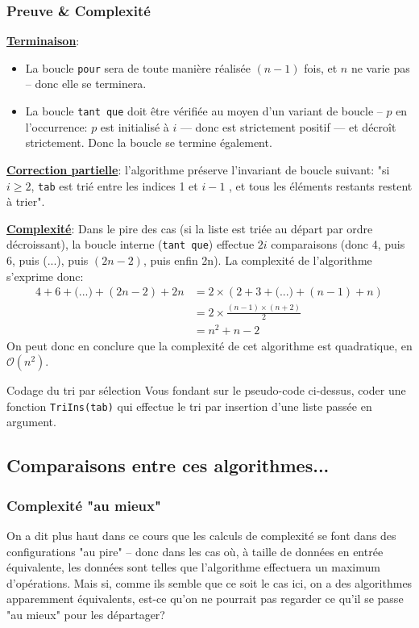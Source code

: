 \documentclass[12pt]{article}
\begin{document}
	\subsubsection*{Preuve \& Complexité}
	\textbf{\uline{Terminaison}}: 
	\begin{itemize}
		\item La boucle \texttt{pour} sera de toute manière réalisée $(n-1)$ fois, et $n$ ne varie pas -- donc elle se terminera.
		\item La boucle \texttt{tant que} doit être vérifiée au moyen d'un variant de boucle -- $p$ en l'occurrence: $p$ est initialisé à $i$ --- donc est strictement positif --- et décroît strictement. Donc la boucle se termine également.
	\end{itemize}
	
	\textbf{\uline{Correction partielle}}: l'algorithme préserve l'invariant de boucle suivant: "si $i \geq 2$, \texttt{tab} est trié entre les indices 1 et $i - 1$ , et tous les éléments restants restent à trier".
	
	\textbf{\uline{Complexité}}: Dans le pire des cas (si la liste est triée au départ par ordre décroissant), la boucle interne (\texttt{tant que}) effectue $2i$ comparaisons (donc 4, puis 6, puis (...), puis $(2n - 2)$, puis enfin 2n). La complexité de l'algorithme s'exprime donc:
	\begin{align*}
	4 + 6 + \text{(...)} + (2n-2) + 2n &= 2 \times (2 + 3 + \text{(...)} + (n-1) + n) \\
	&= 2 \times \frac{(n-1)\times (n+2)}{2} \\
	&= n^2 + n - 2
	\end{align*}
	On peut donc en conclure que la complexité de cet algorithme est quadratique, en $\mathcal{O}(n^2)$.
	
	\begin{MonExo}{Codage du tri par sélection}
		Vous fondant sur le pseudo-code ci-dessus, coder une fonction \texttt{TriIns(tab)} qui effectue le tri par insertion d'une liste passée en argument.
	\end{MonExo}
	\begin{MaReponse}
	\end{MaReponse}
	
	\subsection{Comparaisons entre ces algorithmes...}
	\subsubsection*{Complexité "au mieux"}
	On a dit plus haut dans ce cours que les calculs de complexité se font dans des configurations "au pire" -- donc dans les cas où, à taille de données en entrée équivalente, les données sont telles que l'algorithme effectuera un maximum d'opérations. Mais si, comme ils semble que ce soit le cas ici, on a des algorithmes apparemment équivalents, est-ce qu'on ne pourrait pas regarder ce qu'il se passe "au mieux" pour les départager?
	
\end{document}
